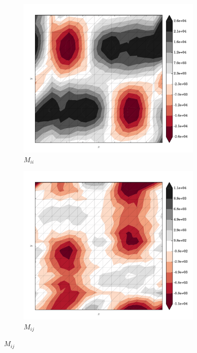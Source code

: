 \begin{figure}
  \begin{subfigure}[b]{0.3\linewidth}
    \includegraphics[width=\linewidth]{images/stress_balance/RS/M_ii.pdf}
  \caption{$M_{ii}$}
  \label{rs_M_ii}
  \end{subfigure}
  \begin{subfigure}[b]{0.3\linewidth}
    \includegraphics[width=\linewidth]{images/stress_balance/RS/M_ij.pdf}
  \caption{$M_{ij}$}
  \label{rs_M_ij}
  \end{subfigure}

\end{figure}
